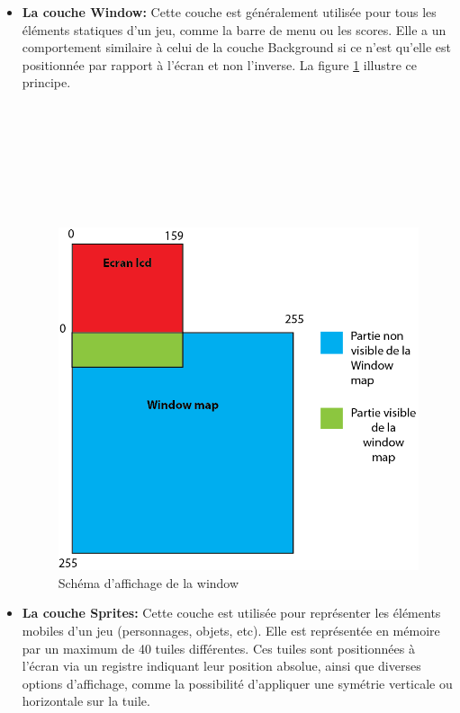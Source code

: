 \documentclass[french]{report}
\begin{document}
\begin{itemize}
\item \textbf{La couche Window:}
	Cette couche est généralement utilisée pour tous les éléments statiques
d'un jeu, comme la barre de menu ou les scores. Elle a un comportement
similaire à celui de la couche Background si ce n'est qu'elle est positionnée par rapport à l'écran et non l'inverse. La figure \ref{window} illustre ce principe.\\\\\\\\\\\\\\\\

\begin{figure}[!h]
\centering
\includegraphics[scale=0.8]{images/window.png}
\caption{Schéma d'affichage de la window}
\label{window}
\end{figure}

\item \textbf{La couche Sprites:}
	Cette couche est utilisée pour représenter les éléments mobiles d'un jeu (personnages, objets, etc). Elle est représentée en mémoire par un maximum
de 40 tuiles différentes. Ces tuiles sont positionnées à l'écran via un registre indiquant leur position absolue, ainsi que diverses options d'affichage, comme la possibilité d'appliquer une symétrie verticale ou horizontale sur la tuile.\\
\end{itemize}
\end{document}
